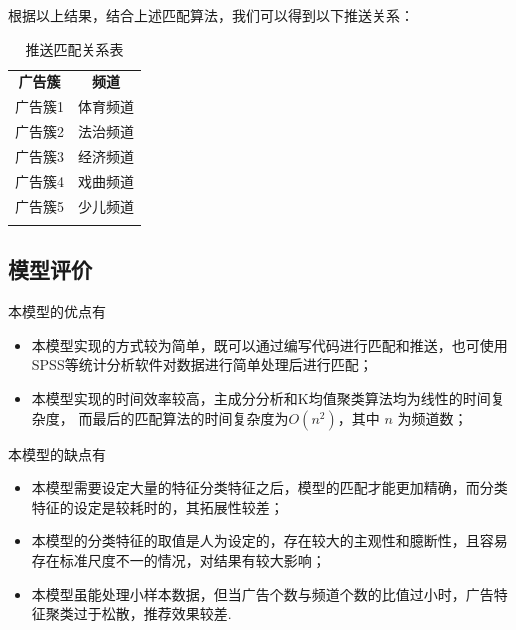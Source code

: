 根据以上结果，结合上述匹配算法，我们可以得到以下推送关系：

\begin{table}[H]
    \centering
    \caption{推送匹配关系表}
    \begin{tabular}{|c|c|}
        \Xhline{1.2pt}
        \textbf{广告簇} & \textbf{频道} \\
        \Xhline{1.2pt}
        广告簇1 & 体育频道 \\
        广告簇2 & 法治频道 \\
        广告簇3 & 经济频道 \\
        广告簇4 & 戏曲频道 \\
        广告簇5 & 少儿频道 \\
        \Xhline{1.2pt}
    \end{tabular}
    \label{tab:march}
\end{table}

\subsection{模型评价}

本模型的优点有

\begin{itemize}
    \item 本模型实现的方式较为简单，既可以通过编写代码进行匹配和推送，也可使用
    SPSS等统计分析软件对数据进行简单处理后进行匹配；
    \item 本模型实现的时间效率较高，主成分分析和K均值聚类算法均为线性的时间复杂度，
    而最后的匹配算法的时间复杂度为$O(n^2)$，其中 $n$ 为频道数；
\end{itemize}

本模型的缺点有

\begin{itemize}
    \item 本模型需要设定大量的特征分类特征之后，模型的匹配才能更加精确，而分类特征的设定是较耗时的，其拓展性较差；
    \item 本模型的分类特征的取值是人为设定的，存在较大的主观性和臆断性，且容易存在标准尺度不一的情况，对结果有较大影响；
    \item 本模型虽能处理小样本数据，但当广告个数与频道个数的比值过小时，广告特征聚类过于松散，推荐效果较差.
\end{itemize}

